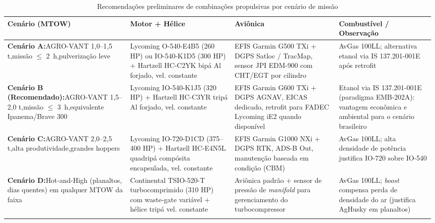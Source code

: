 \documentclass[a4paper,12pt]{article}
\begin{document}
\begin{table}[H]
\centering
\caption{Recomendações preliminares de combinações propulsivas por cenário de missão}
\label{tab:recomendacoes}
\footnotesize
\renewcommand{\arraystretch}{1.3}
\begin{tabularx}{\textwidth}{@{} 
    >{\hsize=0.9\hsize\raggedright\arraybackslash}X 
    >{\hsize=1.0\hsize\raggedright\arraybackslash}X 
    >{\hsize=0.9\hsize\raggedright\arraybackslash}X 
    >{\hsize=1.2\hsize\raggedright\arraybackslash}X 
    @{}}
\toprule
\textbf{Cenário (MTOW)} & \textbf{Motor + Hélice} & \textbf{Aviônica} & \textbf{Combustível / Observação} \\ \midrule
\textbf{Cenário A:}\newline AGRO-VANT 1{,}0--1{,}5 t,\newline missão $\leq$ \SI{2}{h},\newline pulverização leve & Lycoming O-540-E4B5 (260 HP) ou IO-540-K1D5 (300 HP) + Hartzell HC-C2YK bipá Al forjado, vel. constante & EFIS Garmin G500 TXi + DGPS Satloc / TracMap, sensor JPI EDM-900 com CHT/EGT por cilindro & AvGas 100LL; alternativa etanol via IS 137.201-001E após retrofit \\
\addlinespace
\textbf{Cenário B (Recomendado):}\newline AGRO-VANT 1{,}5--2{,}0 t,\newline missão $\leq$ \SI{3}{h},\newline equivalente Ipanema/Brave 300 & Lycoming IO-540-K1J5 (320 HP) + Hartzell HC-C3YR tripá Al forjado, vel. constante & EFIS Garmin G600 TXi + DGPS AGNAV, EICAS dedicado, retrofit para FADEC Lycoming iE2 quando disponível & Etanol via IS 137.201-001E (paradigma EMB-202A): vantagem econômica e ambiental para o cenário brasileiro \\
\addlinespace
\textbf{Cenário C:}\newline AGRO-VANT 2{,}0--2{,}5 t,\newline alta produtividade,\newline grandes hoppers & Lycoming IO-720-D1CD (375--400 HP) + Hartzell HC-E4N5L quadripá compósita encapsulada, vel. constante & EFIS Garmin G1000 NXi + DGPS RTK, ADS-B Out, manutenção baseada em condição (CBM) & AvGas 100LL; alta densidade de potência justifica IO-720 sobre IO-540 \\
\addlinespace
\textbf{Cenário D:}\newline Hot-and-High (planaltos, dias quentes) em qualquer MTOW da faixa & Continental TSIO-520-T turbocomprimido (310 HP) com waste-gate variável + hélice tripá vel. constante & Aviônica padrão + sensor de pressão de \textit{manifold} para gerenciamento do turbocompressor & AvGas 100LL; \textit{boost} compensa perda de densidade do ar (justifica AgHusky em planaltos) \\ \bottomrule
\multicolumn{4}{l}{\footnotesize Elaboração do autor com base em \cite{lycomingmanual, lycoming_io720, continental_io520, embraer202, piper_pa36}.}
\end{tabularx}
\end{table}
\end{document}
